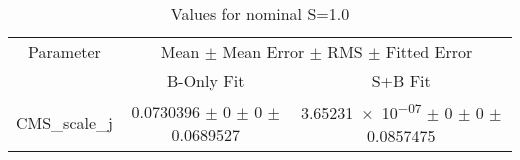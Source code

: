 \begin{table}
\centering
\caption{Values for nominal S=1.0}
\begin{tabular}{ccc}
\toprule
Parameter 	& \multicolumn{2}{c}{Mean $\pm$ Mean Error $\pm$ RMS $\pm$ Fitted Error}\\
 	& B-Only Fit & S+B Fit\\
\midrule
CMS\_scale\_j 	& \num{0.0730396} $\pm$ \num{0} $\pm$ \num{0} $\pm$ \num{0.0689527} 	& \num{3.65231e-07} $\pm$ \num{0} $\pm$ \num{0} $\pm$ \num{0.0857475}\\
\bottomrule
\end{tabular}
\end{table}